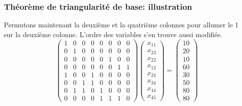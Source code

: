 \documentclass[usepdftitle=false, aspectratio=169]{beamer}
\begin{document}
\begin{frame}
\frametitle{Théorème de triangularité de base: illustration}

Permutons maintenant la deuxième et la quatrième colonnes pour allumer le 1 sur la deuxième colonne. L'ordre des variables s'en trouve aussi modifiée.
\[
\begin{pmatrix}
 1 & 0 & 0 & 0 & 0 & 0 & 0 & 0 \\
 0 & 1 & 0 & 0 & 0 & 0 & 0 & 0 \\
 0 & 0 & 0 & 0 & 0 & 1 & 0 & 0 \\
 0 & 0 & 0 & 0 & 0 & 0 & 1 & 1 \\
 1 & 0 & 0 & 1 & 0 & 0 & 0 & 0 \\
 0 & 0 & 1 & 1 & 0 & 0 & 0 & 0 \\
 0 & 1 & 1 & 0 & 1 & 0 & 0 & 0 \\
 0 & 0 & 0 & 0 & 1 & 1 & 1 & 0
\end{pmatrix}
\begin{pmatrix}
x_{11} \\
x_{23} \\
x_{22} \\
x_{12} \\
x_{24} \\
x_{34} \\
x_{44} \\
x_{45}
\end{pmatrix}
=
\begin{pmatrix}
10 \\
20 \\
10 \\
60 \\
30 \\
50 \\
80 \\
80
\end{pmatrix}
\]

\end{frame}
\end{document}

